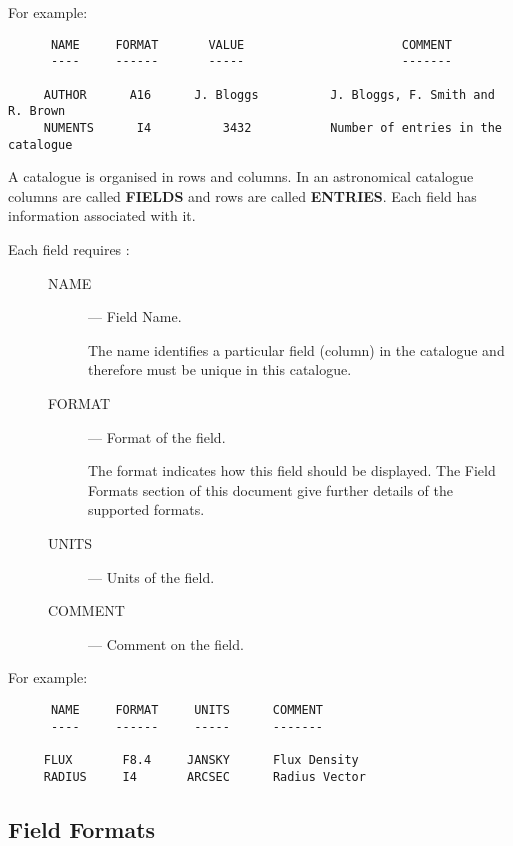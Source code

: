 For example:
\begin{small}
\begin{verbatim}
      NAME     FORMAT       VALUE                      COMMENT
      ----     ------       -----                      -------

     AUTHOR      A16      J. Bloggs          J. Bloggs, F. Smith and R. Brown
     NUMENTS      I4          3432           Number of entries in the catalogue
\end{verbatim}
\end{small}

A catalogue is organised in rows and columns. In an astronomical  catalogue
columns are called
{\bf FIELDS} and rows are called {\bf ENTRIES}. Each field has information
associated with it.

Each field requires :

\begin{description}
\item[\mbox{}]\mbox{}
\begin{description}
\item [NAME] --- Field Name.

The name identifies a particular field (column) in the
catalogue and therefore must be unique in this catalogue.

\item [FORMAT] --- Format of the field.

The format indicates how this field should be displayed. The Field Formats
section of this document give further details of the supported formats.

\item [UNITS] --- Units of the field.

\item [COMMENT] --- Comment on the field.

\end{description}
\end{description}

For example:

\begin{small}
\begin{verbatim}
      NAME     FORMAT     UNITS      COMMENT
      ----     ------     -----      -------

     FLUX       F8.4     JANSKY      Flux Density
     RADIUS     I4       ARCSEC      Radius Vector
\end{verbatim}
\end{small}

\subsection {Field Formats}

